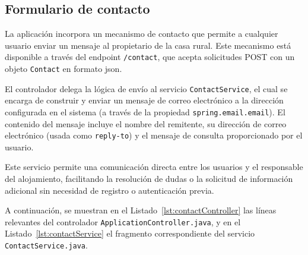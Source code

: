 \subsection{Formulario de contacto}
La aplicación incorpora un mecanismo de contacto que permite a cualquier usuario enviar un mensaje al propietario de la casa rural. Este mecanismo está disponible a través del endpoint \texttt{/contact}, que acepta solicitudes POST con un objeto \texttt{Contact} en formato \gls{json}.

El controlador delega la lógica de envío al servicio \texttt{ContactService}, el cual se encarga de construir y enviar un mensaje de correo electrónico a la dirección configurada en el sistema (a través de la propiedad \texttt{spring.email.email}). El contenido del mensaje incluye el nombre del remitente, su dirección de correo electrónico (usada como \texttt{reply-to}) y el mensaje de consulta proporcionado por el usuario.

Este servicio permite una comunicación directa entre los usuarios y el responsable del alojamiento, facilitando la resolución de dudas o la solicitud de información adicional sin necesidad de registro o autenticación previa.

A continuación, se muestran en el Listado~\ref{lst:contactController} las líneas relevantes del controlador \texttt{ApplicationController.java}, y en el Listado~\ref{lst:contactService} el fragmento correspondiente del servicio \texttt{ContactService.java}.




